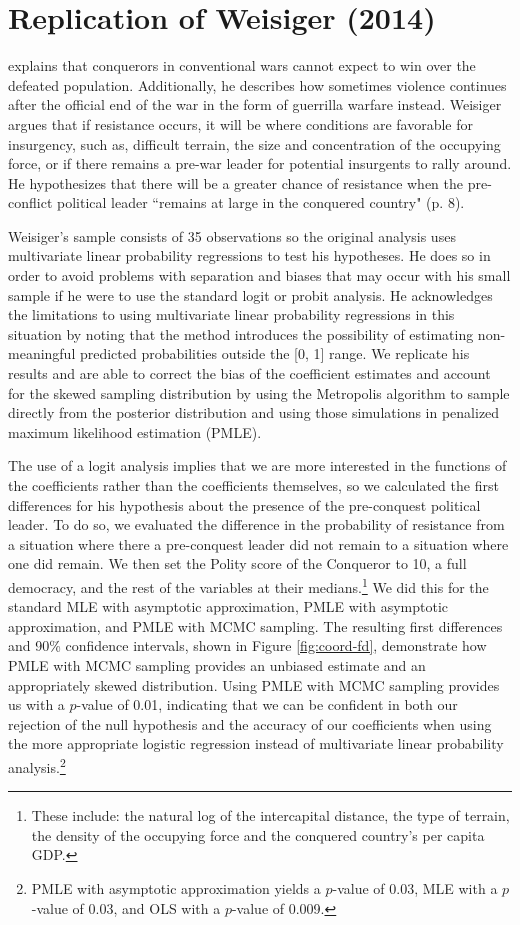 \documentclass[12pt]{article}
\begin{document}
\section*{Replication of Weisiger (2014)}
\citet{Weisiger2014} explains that conquerors in conventional wars cannot expect to win over the defeated population. Additionally, he describes how sometimes violence continues after the official end of the war in the form of guerrilla warfare instead. Weisiger argues that if resistance occurs, it will be where conditions are favorable for insurgency, such as, difficult terrain, the size and concentration of the occupying force, or if there remains a pre-war leader for potential insurgents to rally around. He hypothesizes that there will be a greater chance of resistance when the pre-conflict political leader ``remains at large in the conquered country" (p. 8).

Weisiger's sample consists of 35 observations so the original analysis uses multivariate linear probability regressions to test his hypotheses. He does so in order to avoid problems with separation and biases that may occur with his small sample if he were to use the standard logit or probit analysis. He acknowledges the limitations to using multivariate linear probability regressions in this situation by noting that the method introduces the possibility of estimating non-meaningful predicted probabilities outside the [0, 1] range. We replicate his results and are able to correct the bias of the coefficient estimates and account for the skewed sampling distribution by using the Metropolis algorithm to sample directly from the posterior distribution and using those simulations in penalized maximum likelihood estimation (PMLE). 

The use of a logit analysis implies that we are more interested in the functions of the coefficients rather than the coefficients themselves, so we calculated the first differences for his hypothesis about the presence of the pre-conquest political leader. To do so, we evaluated the difference in the probability of resistance from a situation where there a pre-conquest leader did not remain to a situation where one did remain. We then set the Polity score of the Conqueror to 10, a full democracy, and the rest of the variables at their medians.\footnote{These include: the natural log of the intercapital distance, the type of terrain, the density of the occupying force and the conquered country's per capita GDP.}  We did this for the standard MLE with asymptotic approximation, PMLE with asymptotic approximation, and PMLE with MCMC sampling. The resulting first differences and 90\% confidence intervals, shown in Figure \ref{fig:coord-fd}, demonstrate how PMLE with MCMC sampling provides an unbiased estimate and an appropriately skewed distribution. Using PMLE with MCMC sampling provides us with a $p$-value of 0.01, indicating that we can be confident in both our rejection of the null hypothesis and the accuracy of our coefficients when using the more appropriate logistic regression instead of multivariate linear probability analysis.\footnote{PMLE with asymptotic approximation yields a $p$-value of 0.03, MLE with a $p$-value of 0.03, and OLS with a $p$-value of 0.009.} 
\end{document}
